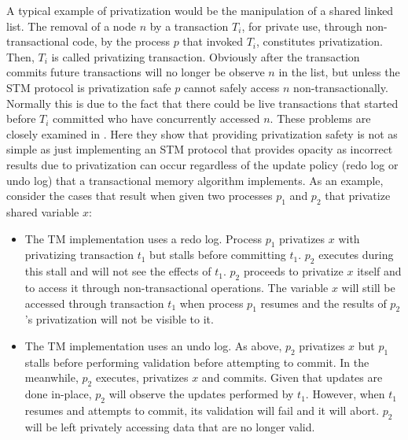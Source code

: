 A typical  example of privatization would  be the manipulation  of a shared
linked list. The  removal of a node $n$ by a  transaction $T_i$, for private
use, through  non-transactional  code,  by  the process $p$ that  invoked $T_i$,  
constitutes  privatization. Then, $T_i$  is called privatizing transaction. 
Obviously after the transaction commits future transactions will no longer
be observe $n$ in the list, but unless the STM protocol is privatization safe
$p$ cannot safely access $n$ non-transactionally.
Normally this is due to the fact that there could be live transactions
that started before $T_i$ committed who have concurrently accessed $n$.
These problems are closely examined in \cite{spear08}.
Here they show that providing privatization safety is not as
simple as just implementing an STM protocol that provides opacity as incorrect results due to
privatization can occur regardless of the update policy
(redo log or undo log)  that a  transactional memory algorithm implements. 
As  an example, consider
the cases that result when given two processes $p_1$ and   
$p_2$ that privatize shared variable $x$:
\begin{itemize}
\vspace{-0.1cm}
\item  
The TM implementation  uses a  redo log.  Process $p_1$ privatizes  $x$ with
privatizing transaction $t_1$ but stalls before committing $t_1$.  
$p_2$ executes during this stall and will not see the effects of $t_1$. 
$p_2$ proceeds to privatize $x$ itself and to access it through 
non-transactional operations. The variable $x$  will still be accessed through 
transaction $t_1$ when process $p_1$ resumes and the results of $p_2$'s 
privatization will not be visible to it. 
\vspace{-0.2cm}
\item The TM implementation uses an undo log. As above, $p_2$ privatizes 
$x$ but $p_1$ stalls before performing validation before attempting 
to commit. In the meanwhile, $p_2$ executes, privatizes $x$ and commits. 
Given that updates are done in-place, $p_2$ will observe the updates 
performed by $t_1$. However, when $t_1$ resumes and attempts to commit, 
its validation will fail and it will abort. $p_2$ will be left privately 
accessing data that are no longer valid.
\end{itemize}


